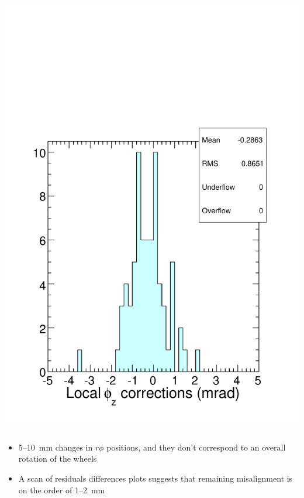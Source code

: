 \documentclass[compress]{beamer}
\begin{document}
\begin{frame}
\begin{columns}
\includegraphics[width=\linewidth]{corrections_phiz.pdf}
\end{columns}

\vfill
\begin{itemize}
\item 5--10~mm changes in $r\phi$ positions, and they don't correspond to an overall rotation of the wheels

\item A scan of residuals differences plots suggests that remaining misalignment is on the order of 1--2~mm
\end{itemize}
\end{frame}

\end{document}

